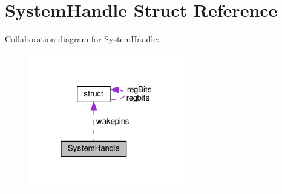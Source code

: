 \hypertarget{structSystemHandle}{}\section{System\+Handle Struct Reference}
\label{structSystemHandle}


Collaboration diagram for System\+Handle\+:\nopagebreak
\begin{figure}[H]
\begin{center}
\leavevmode
\includegraphics[width=193pt]{structSystemHandle__coll__graph}
\end{center}
\end{figure}
